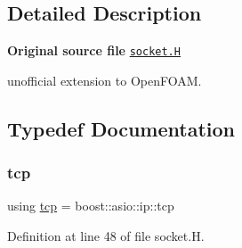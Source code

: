\subsection{Detailed Description}
{\bfseries Original source file} \href{../../../home/carlo/data/GeN-Foam/GeN-Foam_ffn/GeN-Foam/GeN-Foam/FMU4FOAM/ECI4FOAM/src/externalComm/networkInterface/socket.H}{\tt socket.\+H}

\begin{DoxyVerb}unofficial extension to OpenFOAM.\end{DoxyVerb}


\subsection{Typedef Documentation}
\mbox{\label{socket_8H_aacd32e7300ba1ea408f0cb79dbe33d86}} 
\subsubsection{\texorpdfstring{tcp}{tcp}}
{\footnotesize\ttfamily using \hyperlink{socket_8H_aacd32e7300ba1ea408f0cb79dbe33d86}{tcp} =  boost\+::asio\+::ip\+::tcp}



Definition at line 48 of file socket.\+H.

